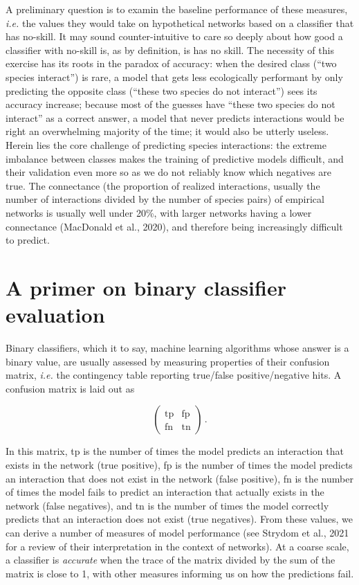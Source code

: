 \documentclass[11pt]{article}
\begin{document}
A preliminary question is to examin the baseline performance of these
measures, \emph{i.e.} the values they would take on hypothetical
networks based on a classifier that has no-skill. It may sound
counter-intuitive to care so deeply about how good a classifier with
no-skill is, as by definition, is has no skill. The necessity of this
exercise has its roots in the paradox of accuracy: when the desired
class (``two species interact'') is rare, a model that gets less
ecologically performant by only predicting the opposite class (``these
two species do not interact'') sees its accuracy increase; because most
of the guesses have ``these two species do not interact'' as a correct
answer, a model that never predicts interactions would be right an
overwhelming majority of the time; it would also be utterly useless.
Herein lies the core challenge of predicting species interactions: the
extreme imbalance between classes makes the training of predictive
models difficult, and their validation even more so as we do not
reliably know which negatives are true. The connectance (the proportion
of realized interactions, usually the number of interactions divided by
the number of species pairs) of empirical networks is usually well under
20\%, with larger networks having a lower connectance (MacDonald et al.,
2020), and therefore being increasingly difficult to predict.

\hypertarget{a-primer-on-binary-classifier-evaluation}{%
\section{A primer on binary classifier
evaluation}\label{a-primer-on-binary-classifier-evaluation}}

Binary classifiers, which it to say, machine learning algorithms whose
answer is a binary value, are usually assessed by measuring properties
of their confusion matrix, \emph{i.e.} the contingency table reporting
true/false positive/negative hits. A confusion matrix is laid out as

\[\begin{pmatrix}
    \text{tp} & \text{fp} \\
    \text{fn} & \text{tn}
\end{pmatrix} \,.\]

In this matrix, tp is the number of times the model predicts an
interaction that exists in the network (true positive), fp is the number
of times the model predicts an interaction that does not exist in the
network (false positive), fn is the number of times the model fails to
predict an interaction that actually exists in the network (false
negatives), and tn is the number of times the model correctly predicts
that an interaction does not exist (true negatives). From these values,
we can derive a number of measures of model performance (see Strydom et
al., 2021 for a review of their interpretation in the context of
networks). At a coarse scale, a classifier is \emph{accurate} when the
trace of the matrix divided by the sum of the matrix is close to 1, with
other measures informing us on how the predictions fail.
\end{document}
